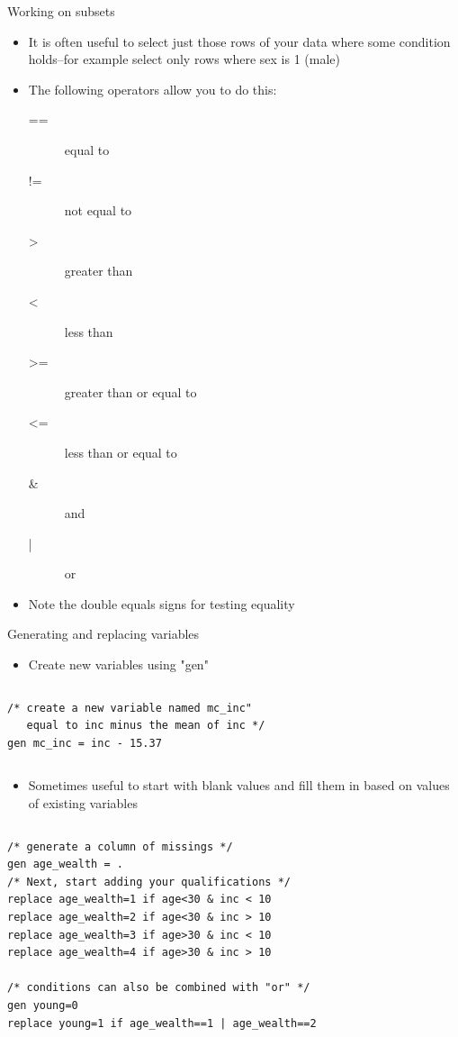\documentclass[table,smaller]{beamer}
\begin{document}
\begin{frame}[label=sec-4-4]{Working on subsets}
\begin{itemize}
\item It is often useful to select just those rows of your data where some condition holds--for example select only rows where sex is 1 (male)
\item The following operators allow you to do this:
\begin{description}
\item[{==}] equal to
\item[{!=}] not equal to
\item[{>}] greater than
\item[{<}] less than
\item[{>=}] greater than or equal to
\item[{<=}] less than or equal to
\item[{\&}] and
\item[{|}] or
\end{description}
\item Note the double equals signs for testing equality
\end{itemize}
\end{frame}
\begin{frame}[fragile,label=sec-4-5]{Generating and replacing variables}
 \begin{itemize}
\item Create new variables using "gen"
\end{itemize}
\vspace{-.5em} \begin{columns}  \begin{block}{}
\begin{verbatim}
/* create a new variable named mc_inc"
   equal to inc minus the mean of inc */
gen mc_inc = inc - 15.37
\end{verbatim}
\end{block} \end{columns}

\begin{itemize}
\item Sometimes useful to start with blank values and fill them in based on values of existing variables
\end{itemize}

\vspace{-.5em} \begin{columns}  \begin{block}{}
\begin{verbatim}
/* generate a column of missings */ 
gen age_wealth = .
/* Next, start adding your qualifications */
replace age_wealth=1 if age<30 & inc < 10
replace age_wealth=2 if age<30 & inc > 10
replace age_wealth=3 if age>30 & inc < 10
replace age_wealth=4 if age>30 & inc > 10

/* conditions can also be combined with "or" */
gen young=0
replace young=1 if age_wealth==1 | age_wealth==2
\end{verbatim}
\end{block} \end{columns}
\end{frame}
\end{document}
